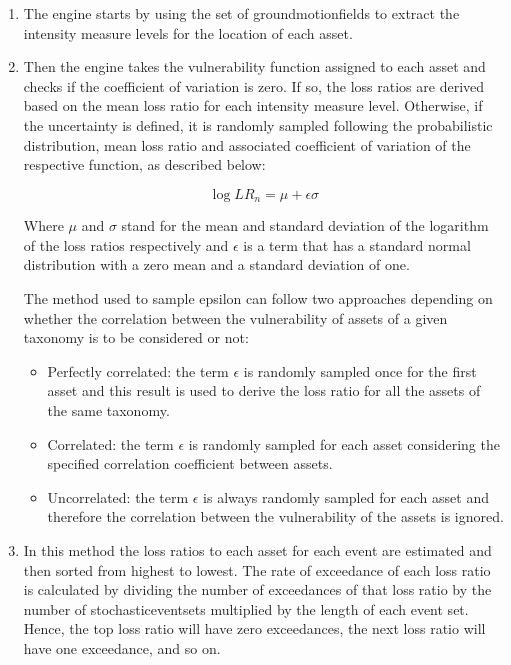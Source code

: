 \begin{enumerate}
\item The  engine starts by using the set of \glspl{groundmotionfield} to extract the intensity measure levels for the location of each \gls{asset}. 
 
\item Then the engine takes the \gls{vulnerability function} assigned to each \gls{asset} and checks if the coefficient of variation is zero. If so, the loss ratios are derived based on the mean loss ratio for each intensity measure level. Otherwise, if the uncertainty is defined, it is randomly sampled following the probabilistic distribution, mean loss ratio and associated coefficient of variation of the respective function, as described below:

\begin{equation}
\log{LR_n} = \mu + \epsilon\sigma
\end{equation}

Where $\mu$ and $\sigma$ stand for the mean and standard deviation of the logarithm of the loss ratios respectively and $\epsilon$ is a term that has a standard normal distribution with a zero mean and a standard deviation of one.  

The method used to sample epsilon can follow two approaches depending on whether the correlation between the vulnerability of \glspl{asset} of a given \gls{taxonomy} is to be considered or not:

\begin{itemize}

\item Perfectly correlated: the term $\epsilon$ is randomly sampled once for the first \gls{asset} and this result is used to derive the loss ratio for all the \glspl{asset} of the same \gls{taxonomy}. 

\item Correlated: the term $\epsilon$ is randomly sampled for each \gls{asset} considering the specified correlation coefficient between \glspl{asset}. 

\item Uncorrelated: the term $\epsilon$ is always randomly sampled for each \gls{asset} and therefore the correlation between the vulnerability of the \glspl{asset} is ignored.
\end{itemize}

\item In this method the loss ratios to each \gls{asset} for each event are estimated and then sorted from highest to lowest. The rate of exceedance of each loss ratio is calculated by dividing the number of exceedances of that loss ratio by the number of \glspl{stochasticeventset} multiplied by the length of each event set. Hence, the top loss ratio will have zero exceedances, the next loss ratio will have one exceedance, and so on.


\end{enumerate}
